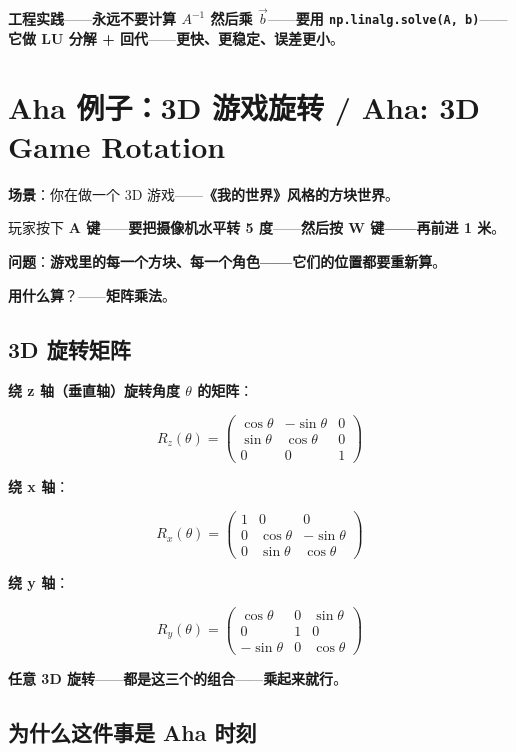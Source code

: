 \textbf{工程实践}——\textbf{永远不要计算 $A^{-1}$ 然后乘 $\vec{b}$}——\textbf{要用 \texttt{np.linalg.solve(A, b)}}——\textbf{它做 LU 分解 + 回代}——\textbf{更快、更稳定、误差更小}。

\section{Aha 例子：3D 游戏旋转 / Aha: 3D Game Rotation}

\textbf{场景}：你在做一个 3D 游戏——\textbf{《我的世界》风格的方块世界}。

玩家按下 \textbf{A 键}——\textbf{要把摄像机水平转 5 度}——\textbf{然后按 \textbf{W 键}——再前进 1 米}。

\textbf{问题}：\textbf{游戏里的每一个方块、每一个角色——它们的位置都要重新算}。

\textbf{用什么算}？——\textbf{矩阵乘法}。

\subsection{3D 旋转矩阵}

\textbf{绕 z 轴（垂直轴）旋转角度 $\theta$ 的矩阵}：

\[
R_z(\theta) = \begin{pmatrix}
\cos\theta & -\sin\theta & 0 \\
\sin\theta & \cos\theta & 0 \\
0 & 0 & 1
\end{pmatrix}
\]

\textbf{绕 x 轴}：

\[
R_x(\theta) = \begin{pmatrix}
1 & 0 & 0 \\
0 & \cos\theta & -\sin\theta \\
0 & \sin\theta & \cos\theta
\end{pmatrix}
\]

\textbf{绕 y 轴}：

\[
R_y(\theta) = \begin{pmatrix}
\cos\theta & 0 & \sin\theta \\
0 & 1 & 0 \\
-\sin\theta & 0 & \cos\theta
\end{pmatrix}
\]

\textbf{任意 3D 旋转}——\textbf{都是这三个的组合}——\textbf{乘起来就行}。

\subsection{为什么这件事是 Aha 时刻}

